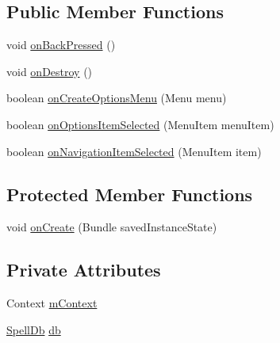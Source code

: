 \subsection*{Public Member Functions}
\begin{DoxyCompactItemize}
\item 
void \hyperlink{classorg_1_1buildmlearn_1_1learnspellings_1_1activities_1_1ResponseActivity_ae99e06562ef58da8cfc8c167f60380c3}{on\+Back\+Pressed} ()
\item 
void \hyperlink{classorg_1_1buildmlearn_1_1learnspellings_1_1activities_1_1ResponseActivity_aa69a32ecf7c5f580613c3606d1ddbfc4}{on\+Destroy} ()
\item 
boolean \hyperlink{classorg_1_1buildmlearn_1_1learnspellings_1_1activities_1_1ResponseActivity_a23a5d316f98d4da187e3ba4a688cede3}{on\+Create\+Options\+Menu} (Menu menu)
\item 
boolean \hyperlink{classorg_1_1buildmlearn_1_1learnspellings_1_1activities_1_1ResponseActivity_a0bf29c4a20acc3790c7ff098602eaa7d}{on\+Options\+Item\+Selected} (Menu\+Item menu\+Item)
\item 
boolean \hyperlink{classorg_1_1buildmlearn_1_1learnspellings_1_1activities_1_1ResponseActivity_a2b8cf86706d367d8706e64b3d1e5c489}{on\+Navigation\+Item\+Selected} (Menu\+Item item)
\end{DoxyCompactItemize}
\subsection*{Protected Member Functions}
\begin{DoxyCompactItemize}
\item 
void \hyperlink{classorg_1_1buildmlearn_1_1learnspellings_1_1activities_1_1ResponseActivity_afd5b309886203db8d172aad75e3797b1}{on\+Create} (Bundle saved\+Instance\+State)
\end{DoxyCompactItemize}
\subsection*{Private Attributes}
\begin{DoxyCompactItemize}
\item 
Context \hyperlink{classorg_1_1buildmlearn_1_1learnspellings_1_1activities_1_1ResponseActivity_a1e7e74f55686d50dc3b17b13e9a85704}{m\+Context}
\item 
\hyperlink{classorg_1_1buildmlearn_1_1learnspellings_1_1data_1_1SpellDb}{Spell\+Db} \hyperlink{classorg_1_1buildmlearn_1_1learnspellings_1_1activities_1_1ResponseActivity_abeb605f24098ee50c85dfb25df867d6c}{db}
\end{DoxyCompactItemize}



